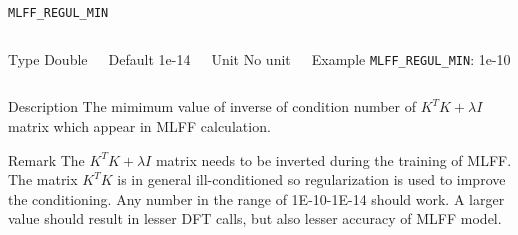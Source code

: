 \begin{frame}[allowframebreaks]{\texttt{{MLFF\_REGUL\_MIN}}} \label{MLFF_REGUL_MIN}
\vspace*{-12pt}
\begin{columns}
\begin{block}{Type}
Double
\end{block}

\begin{block}{Default}
1e-14
\end{block}

\begin{block}{Unit}
No unit
\end{block}

\begin{block}{Example}
\texttt{MLFF\_REGUL\_MIN}: 1e-10
\end{block}
\end{columns}

\begin{block}{Description}
 The mimimum value of inverse of condition number of $K^TK + \lambda I$ matrix which appear in MLFF calculation.
\end{block}

\begin{block}{Remark}
The $K^TK + \lambda I$ matrix needs to be inverted during the training of MLFF. The matrix $K^TK$ is in general ill-conditioned so regularization is used to improve the conditioning. Any number in the range of 1E-10-1E-14 should work. A larger value should result in lesser DFT calls, but also lesser accuracy of MLFF model.
\end{block}
\end{frame}

